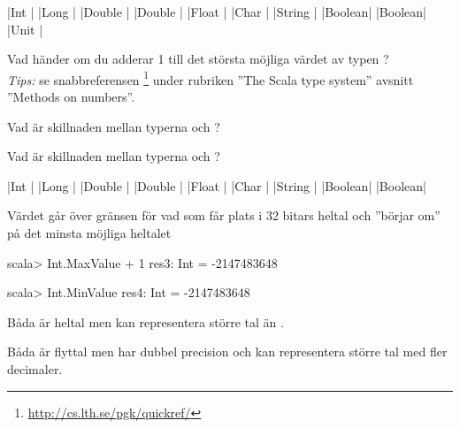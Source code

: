 \begin{ConceptConnections}[0.35\textwidth]
  {\code|Int    |}
  {\code|Long   |}
  {\code|Double |}
  {\code|Double |}
  {\code|Float  |}
  {\code|Char   |}
  {\code|String |}
  {\code|Boolean|} 
  {\code|Boolean|} 
\Connect{\code|()     |}  {\code|Unit   |} 
\end{ConceptConnections}
\Subtask Vad händer om du adderar 1 till det största möjliga värdet av typen ? 
\\\emph{Tips:} se snabbreferensen \footnote{\url{http://cs.lth.se/pgk/quickref/}} under rubriken ''The Scala type system'' avsnitt ''Methods on numbers''.

\Subtask Vad är skillnaden mellan typerna  och ?

\Subtask Vad är skillnaden mellan typerna  och ?

\SOLUTION

\TaskSolved \what

\SubtaskSolved 
\begin{ConceptConnections}[0\textwidth]
  {\code|Int    |}
  {\code|Long   |}
  {\code|Double |}
  {\code|Double |}
  {\code|Float  |}
  {\code|Char   |}
  {\code|String |}
  {\code|Boolean|} 
  {\code|Boolean|} 
\end{ConceptConnections}

\SubtaskSolved Värdet går över gränsen för vad som får plats i 32 bitars heltal och ''börjar om'' på det minsta möjliga heltalet 
\begin{REPL}
scala> Int.MaxValue + 1
res3: Int = -2147483648

scala> Int.MinValue
res4: Int = -2147483648
\end{REPL}

\SubtaskSolved Båda är heltal men  kan representera större tal än .

\SubtaskSolved Båda är flyttal men  har dubbel precision och kan representera större tal med fler decimaler.


